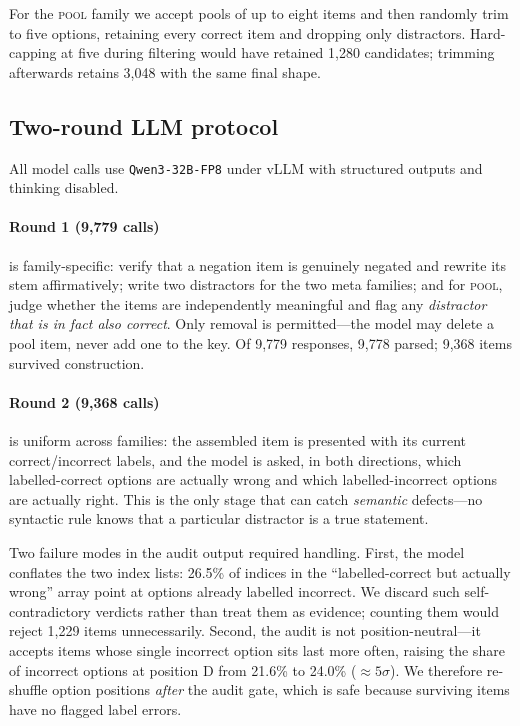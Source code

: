\documentclass{article} %
\begin{document}
For the \textsc{pool} family we accept pools of up to eight items and then randomly trim
to five options, retaining every correct item and dropping only distractors. Hard-capping
at five during filtering would have retained 1,280 candidates; trimming afterwards retains
3,048 with the same final shape.

\subsection{Two-round LLM protocol}

All model calls use \texttt{Qwen3-32B-FP8} under vLLM with structured outputs and thinking
disabled.

\paragraph{Round 1 (9,779 calls)} is family-specific: verify that a negation item is
genuinely negated and rewrite its stem affirmatively; write two distractors for the two
meta families; and for \textsc{pool}, judge whether the items are independently meaningful
and flag any \emph{distractor that is in fact also correct}. Only removal is permitted---the
model may delete a pool item, never add one to the key. Of 9,779 responses, 9,778 parsed;
9,368 items survived construction.

\paragraph{Round 2 (9,368 calls)} is uniform across families: the assembled item is
presented with its current correct/incorrect labels, and the model is asked, in both
directions, which labelled-correct options are actually wrong and which labelled-incorrect
options are actually right. This is the only stage that can catch \emph{semantic}
defects---no syntactic rule knows that a particular distractor is a true statement.

Two failure modes in the audit output required handling. First, the model conflates the
two index lists: 26.5\% of indices in the ``labelled-correct but actually wrong'' array
point at options already labelled incorrect. We discard such self-contradictory verdicts
rather than treat them as evidence; counting them would reject 1,229 items unnecessarily.
Second, the audit is not position-neutral---it accepts items whose single incorrect option
sits last more often, raising the share of incorrect options at position D from 21.6\% to
24.0\% ($\approx 5\sigma$). We therefore re-shuffle option positions \emph{after} the audit
gate, which is safe because surviving items have no flagged label errors.
\end{document}
